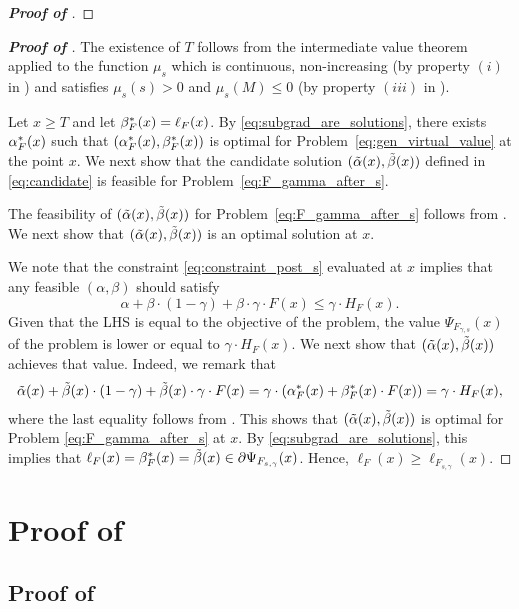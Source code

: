 \begin{proof}[\textbf{Proof of }]
\end{proof}


\begin{proof}[\textbf{Proof of }]
The existence of $T$ follows from the intermediate value theorem applied to the function $\mu_s$ which is continuous, non-increasing (by property $(i)$ in ) and satisfies $\mu_s(s) > 0$ and $\mu_s(M) \leq 0$ (by property $(iii)$ in ).

Let $x \geq T$ and let $\beta^*_F(x) = \ell_F(x)$. By \eqref{eq:subgrad_are_solutions}, there exists $\alpha^*_F(x)$ such that $(\alpha^*_F(x),\beta^*_F(x))$ is optimal for Problem~\eqref{eq:gen_virtual_value} at the point $x$. We next show that the candidate solution $(\tilde{\alpha}(x),\tilde{\beta}(x))$ defined in \eqref{eq:candidate} is feasible for Problem~\eqref{eq:F_gamma_after_s}.

The feasibility of $(\tilde{\alpha}(x),\tilde{\beta}(x))$ for Problem~\eqref{eq:F_gamma_after_s} follows from .
We next show that $(\tilde{\alpha}(x),\tilde{\beta}(x))$ is an optimal solution at $x$.

We note that the constraint \eqref{eq:constraint_post_s} evaluated at $x$ implies that any feasible $(\alpha,\beta)$ should satisfy
\begin{equation*}
\alpha + \beta \cdot (1-\gamma) + \beta \cdot \gamma \cdot F(x) \leq \gamma \cdot H_{F}(x).
\end{equation*}
Given that the LHS is equal to the objective of the problem, the value $\Psi_{F_{\gamma,s}}(x)$ of the problem is lower or equal to $\gamma \cdot H_{F}(x)$. We next show that $(\tilde{\alpha}(x),\tilde{\beta}(x))$ achieves that value. Indeed, we remark that
\begin{align*}
\tilde{\alpha}(x) + \tilde{\beta}(x) \cdot (1-\gamma) + \tilde{\beta}(x) \cdot \gamma \cdot F(x) = \gamma \cdot \left( \alpha^*_F(x) + \beta^*_F(x) \cdot F(x) \right) = \gamma \cdot H_{F}(x),
\end{align*}
where the last equality follows from . 
This shows that $(\tilde{\alpha}(x),\tilde{\beta}(x))$ is optimal for Problem \eqref{eq:F_gamma_after_s} at $x$. By \eqref{eq:subgrad_are_solutions}, this implies that $\ell_{F}(x) = \beta^*_F(x) = \tilde{\beta}(x)   \in \partial \Psi_{F_{s,\gamma}}(x)$. Hence, $\ell_{F}(x) \geq \ell_{F_{s,\gamma}}(x)$.
\end{proof}

\section{Proof of }
\subsection{Proof of } \label{sec:apx_main_proof}


